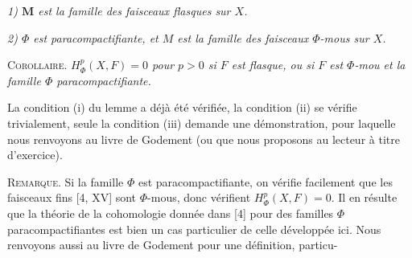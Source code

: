 \indent\textit{\textup{1)} $\mathbf M$ est la famille des faisceaux flasques sur $X$.}

\indent\textit{\textup{2)} $\Phi$ est paracompactifiante, et $M$ est la famille des
faisceaux $\Phi$-mous sur $X$.}

\indent\textsc{Corollaire.} \textit{$H^p_\Phi(X,F)=0$ pour $p>0$ si $F$ est
flasque, ou si $F$ est $\Phi$-mou et la famille $\Phi$
paracompactifiante.}

La condition (i) du lemme a déjà été vérifiée, la condition (ii) se vérifie
trivialement, seule la condition (iii) demande une démonstration, pour
laquelle nous renvoyons au livre de Godement (ou que nous proposons au
lecteur à titre d'exercice).

\indent\textsc{Remarque.} Si la famille $\Phi$ est paracompactifiante, on
vérifie facilement que les faisceaux fins [4, XV] sont $\Phi$-mous, donc
vérifient $H^p_\Phi(X,F)=0$. Il en résulte que la théorie de la cohomologie
donnée dans [4] pour des familles $\Phi$ paracompactifiantes est bien un cas
particulier de celle développée ici. Nous renvoyons aussi au livre de Godement
pour une définition, particu-


